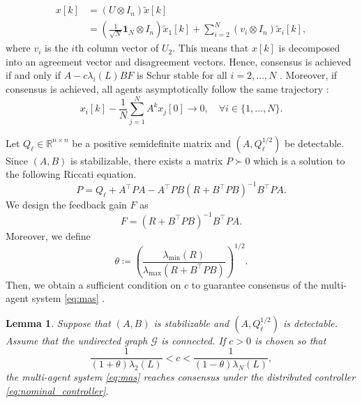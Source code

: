 \documentclass[letterpaper,10pt,conference]{ieeeconf}
\newtheorem{lemma}{Lemma}
\newcommand{\R}{\mathbb{R}}
\newcommand{\graph}{\mathcal{G}}
\begin{document}
\begin{align}
  x[k] &= (U \otimes I_n)\tilde{x}[k] \\
  &= \left(\frac{1}{\sqrt{N}}\mathbf{1}_N \otimes I_n\right)\tilde{x}_1[k]
  + \sum_{i=2}^N (v_i \otimes I_n)\tilde{x}_i[k],
\end{align}
where $v_i$ is the $i$th column vector of $U_2$.
This means that $x[k]$ is decomposed into an agreement vector and disagreement vectors.
Hence, consensus is achieved if and only if $A-c\lambda_i(L)BF$ is Schur stable for all $i=2,\dots,N$ \cite{hengster2013synchronization}.
Moreover, if consensus is achieved, all agents asymptotically follow the same trajectory \cite{li2017cooperative}:
\begin{equation}
  x_i[k] - \frac{1}{N} \sum_{j=1}^{N} A^k x_j[0] \to 0 ,\quad \forall i \in \{1,\dots,N\}.
\end{equation}

Let $Q_\ell \in \R^{n\times n}$ be a positive semidefinite matrix and $(A,Q_\ell^{1/2})$ be detectable.
Since $(A,B)$ is stabilizable, there exists a matrix $P \succ 0$ which is a solution to the following Riccati equation.
\begin{equation} \label{eq:local_riccati_equation}
  P = Q_\ell + A^\top P A - A^\top PB\left(R+B^\top PB\right)^{-1} B^\top PA.
\end{equation}
We design the feedback gain $F$ as
\begin{equation} \label{eq:feedback_gain}
  F = \left(R+B^\top PB\right)^{-1} B^\top PA.
\end{equation}
Moreover, we define
\begin{equation} \label{eq:def_theta}
  \theta \coloneqq \left(\frac{\lambda_{\min}(R)}{\lambda_{\max}(R + B^\top P B)}\right)^{1/2}.
\end{equation}
Then, we obtain a sufficient condition on $c$ to guarantee consensus of the multi-agent system \eqref{eq:mas} \cite{feng2021consensusability}.

\begin{lemma}
  Suppose that $(A,B)$ is stabilizable and $(A,Q_\ell^{1/2})$ is detectable.
  Assume that the undirected graph $\graph$ is connected.
  If $c>0$ is chosen so that
  \begin{equation} \label{eq:condition_c}
    \frac{1}{(1+\theta)\lambda_2(L)} < c < \frac{1}{(1-\theta)\lambda_N(L)},
  \end{equation}
  the multi-agent system \eqref{eq:mas} reaches consensus under the distributed controller \eqref{eq:nominal_controller}.
\end{lemma}
\end{document}
